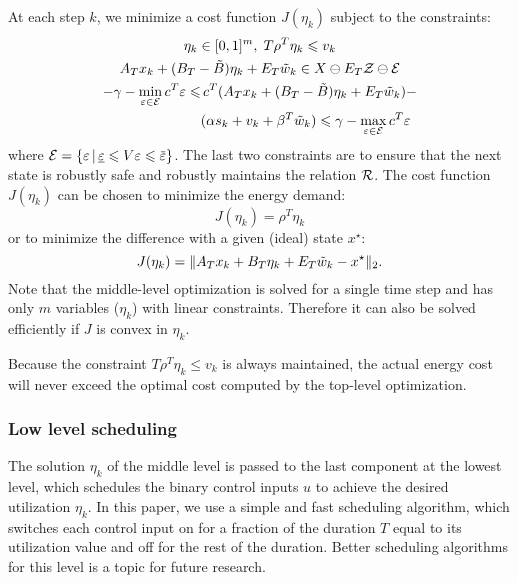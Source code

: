 At each step $k$, we minimize a cost function $J(\eta_{k})$ subject to the constraints:
\begin{gather*}
  \eta_{k} \in [0,1]^{m}, \; T \rho^{T} \eta_{k} \leqslant v_{k} \\
  A_{T} x_{k} + (B_{T} - \tilde{B}) \eta_{k} + E_{T} \tilde{w}_{k} \in X \ominus E_{T} \ZSet \ominus \ESet \\
  \begin{aligned}
    -\gamma - \min_{\varepsilon \in \ESet} c^{T} \varepsilon %
    \leqslant & \, c^{T}(A_{T} x_{k} + (B_{T} - \tilde{B}) \eta_{k}
    + %
    E_{T} \tilde{w}_{k}) - \\
    & (\alpha s_{k} + v_{k} + \beta^{T} \tilde{w}_{k}) \leqslant \gamma
    - \max_{\varepsilon \in \ESet} c^{T}
    \varepsilon %
  \end{aligned}
\end{gather*}
where $\ESet = \{\varepsilon \,|\, \underline{\varepsilon} \leqslant V \varepsilon \leqslant \overbar{\varepsilon}\}$.
The last two constraints are to ensure that the next state is robustly safe and robustly maintains the relation $\mathcal{R}$.
The cost function $J(\eta_{k})$ can be chosen to minimize the energy demand:
\begin{equation*}
  J(\eta_{k}) = \rho^{T} \eta_{k}
\end{equation*}
or to minimize the difference with a given (ideal) state $x^{\star}$:
\begin{equation*}
  J(\eta_{k}) = \| A_{T} x_{k} + B_{T} \eta_{k} + E_{T} \tilde{w}_{k} - x^{\star} \|_{2} \text.
\end{equation*}
%
Note that the middle-level optimization is solved for a single time step and has only $m$ variables ($\eta_{k}$) with linear constraints.
Therefore it can also be solved efficiently if $J$ is convex in $\eta_{k}$.

Because the constraint $T \rho^{T} \eta_{k} \leqslant v_{k}$ is always maintained, the actual energy cost will never exceed the optimal cost computed by the top-level optimization.


\subsubsection{Low level scheduling}

The solution $\eta_{k}$ of the middle level is passed to the last component at the lowest level, which schedules the binary control inputs $u$ to achieve the desired utilization $\eta_{k}$.
In this paper, we use a simple and fast scheduling algorithm, which switches each control input on for a fraction of the duration $T$ equal to its utilization value and off for the rest of the duration.
Better scheduling algorithms for this level is a topic for future research.

